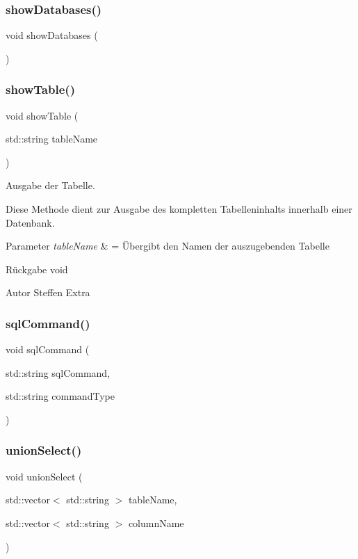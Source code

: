 \subsubsection{show\+Databases()}
{\footnotesize\ttfamily void show\+Databases (\begin{DoxyParamCaption}{ }\end{DoxyParamCaption})}

\mbox{\label{sqllib_8hpp_a22fbeb7f18a00bafd4864de51a3bca28}} 
\subsubsection{show\+Table()}
{\footnotesize\ttfamily void show\+Table (\begin{DoxyParamCaption}\item[{std\+::string}]{table\+Name }\end{DoxyParamCaption})}



Ausgabe der Tabelle. 

Diese Methode dient zur Ausgabe des kompletten Tabelleninhalts innerhalb einer Datenbank.


\begin{DoxyParams}{Parameter}
{\em table\+Name} & = Übergibt den Namen der auszugebenden Tabelle\\
\hline
\end{DoxyParams}
\begin{DoxyReturn}{Rückgabe}
void
\end{DoxyReturn}
\begin{DoxyAuthor}{Autor}
Steffen Extra 
\end{DoxyAuthor}
\mbox{\label{sqllib_8hpp_a51d8bd3191c8ab6e4acdc8053a05a3f5}} 
\subsubsection{sql\+Command()}
{\footnotesize\ttfamily void sql\+Command (\begin{DoxyParamCaption}\item[{std\+::string}]{sql\+Command,  }\item[{std\+::string}]{command\+Type }\end{DoxyParamCaption})}

\mbox{\label{sqllib_8hpp_a1bde570da9c90a3d0f6e94bc1b06c5e3}} 
\subsubsection{union\+Select()}
{\footnotesize\ttfamily void union\+Select (\begin{DoxyParamCaption}\item[{std\+::vector$<$ std\+::string $>$}]{table\+Name,  }\item[{std\+::vector$<$ std\+::string $>$}]{column\+Name }\end{DoxyParamCaption})}

